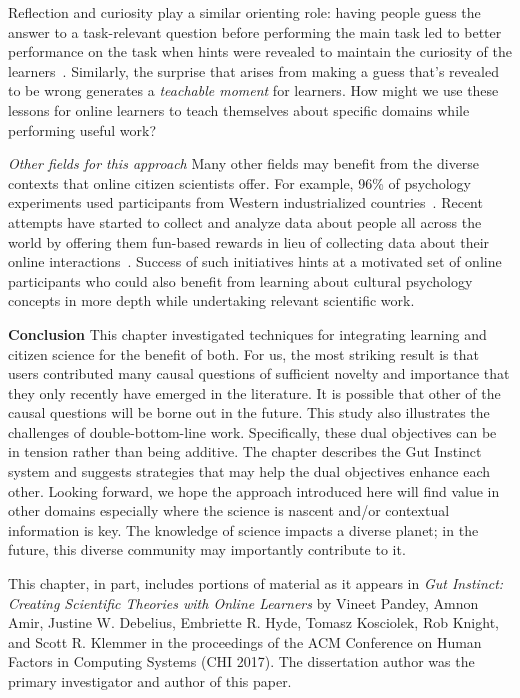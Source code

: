 Reflection and curiosity play a similar orienting role: having people guess the answer to a task-relevant question before performing the main task led to better performance on the task when hints were revealed to maintain the curiosity of the learners~\cite{Aleven2006, Law2016a}. Similarly, the surprise that arises from making a guess that’s revealed to be wrong generates a \textit{teachable moment} for learners. How might we use these lessons for online learners to teach themselves about specific domains while performing useful work? 

\textit{Other fields for this approach}
Many other fields may benefit from the diverse contexts that online citizen scientists offer. For example, 96\% of psychology experiments used participants from Western industrialized countries~\cite{Henrich2010a}. Recent attempts have started to collect and analyze data about people all across the world by offering them fun-based rewards in lieu of collecting data about their online interactions~\cite{Reinecke2015}. Success of such initiatives hints at a motivated set of online participants who could also benefit from learning about cultural psychology concepts in more depth while undertaking relevant scientific work. 

\textbf{Conclusion}
This chapter investigated techniques for integrating learning and citizen science for the benefit of both. For us, the most striking result is that users contributed many causal questions of sufficient novelty and importance that they only recently have emerged in the literature. It is possible that other of the causal questions will be borne out in the future. This study also illustrates the challenges of double-bottom-line work. Specifically, these dual objectives can be in tension rather than being additive. The chapter describes the Gut Instinct system and suggests strategies that may help the dual objectives enhance each other. Looking forward, we hope the approach introduced here will find value in other domains especially where the science is nascent and/or contextual information is key. The knowledge of science impacts a diverse planet; in the future, this diverse community may importantly contribute to it.


This chapter, in part, includes portions of material as it appears in \emph{Gut Instinct: Creating Scientific Theories with Online Learners} by Vineet Pandey, Amnon Amir, Justine W. Debelius, Embriette R. Hyde, Tomasz Kosciolek, Rob Knight, and Scott R. Klemmer in the proceedings of the ACM Conference on Human Factors in Computing Systems (CHI 2017). The dissertation author was the primary investigator and author of this paper.
